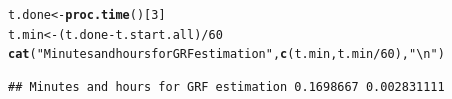 \documentclass[9pt]{article}\usepackage[]{graphicx}\usepackage[]{xcolor}
\makeatletter
\newcommand{\hlnum}[1]{\textcolor[rgb]{0.686,0.059,0.569}{#1}}%
\newcommand{\hlstr}[1]{\textcolor[rgb]{0.192,0.494,0.8}{#1}}%
\newcommand{\hlopt}[1]{\textcolor[rgb]{0,0,0}{#1}}%
\newcommand{\hlstd}[1]{\textcolor[rgb]{0.345,0.345,0.345}{#1}}%
\newcommand{\hlkwb}[1]{\textcolor[rgb]{0.69,0.353,0.396}{#1}}%
\newcommand{\hlkwd}[1]{\textcolor[rgb]{0.737,0.353,0.396}{\textbf{#1}}}%
\newenvironment{kframe}{%
 \def\at@end@of@kframe{}%
 \ifinner\ifhmode%
  \def\at@end@of@kframe{\end{minipage}}%
  \begin{minipage}{\columnwidth}%
 \fi\fi%
 \def\FrameCommand##1{\hskip\@totalleftmargin \hskip-\fboxsep
 \colorbox{shadecolor}{##1}\hskip-\fboxsep
     \hskip-\linewidth \hskip-\@totalleftmargin \hskip\columnwidth}%
 \MakeFramed {\advance\hsize-\width
   \@totalleftmargin\z@ \linewidth\hsize
   \@setminipage}}%
 {\par\unskip\endMakeFramed%
 \at@end@of@kframe}
\newenvironment{knitrout}{}{} %
\theoremstyle{definition}
\theoremstyle{remark}
\makeatother
\begin{document}
\begin{knitrout}
\color{fgcolor}\begin{kframe}
\begin{alltt}
\hlstd{t.done} \hlkwb{<-} \hlkwd{proc.time}\hlstd{()[}\hlnum{3}\hlstd{]}
\hlstd{t.min} \hlkwb{<-} \hlstd{(t.done} \hlopt{-} \hlstd{t.start.all)}\hlopt{/}\hlnum{60}
\hlkwd{cat}\hlstd{(}\hlstr{"Minutes and hours for GRF estimation"}\hlstd{,} \hlkwd{c}\hlstd{(t.min, t.min}\hlopt{/}\hlnum{60}\hlstd{),} \hlstr{"\textbackslash{}n"}\hlstd{)}
\end{alltt}
\begin{verbatim}
## Minutes and hours for GRF estimation 0.1698667 0.002831111
\end{verbatim}
\end{kframe}
\end{knitrout}
\end{document}
